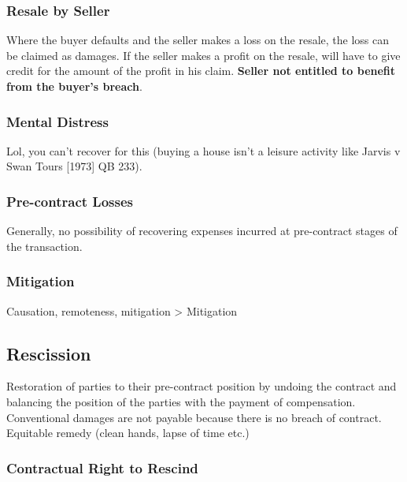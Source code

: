 \documentclass[
]{article}
\begin{document}
\hypertarget{resale-by-seller}{%
\subsubsection{Resale by Seller}\label{resale-by-seller}}

Where the buyer defaults and the seller makes a loss on the resale, the
loss can be claimed as damages. If the seller makes a profit on the
resale, will have to give credit for the amount of the profit in his
claim. \textbf{Seller not entitled to benefit from the buyer's breach}.

\hypertarget{mental-distress}{%
\subsubsection{Mental Distress}\label{mental-distress}}

Lol, you can't recover for this (buying a house isn't a leisure activity
like Jarvis v Swan Tours {[}1973{]} QB 233).

\hypertarget{pre-contract-losses}{%
\subsubsection{Pre-contract Losses}\label{pre-contract-losses}}

Generally, no possibility of recovering expenses incurred at
pre-contract stages of the transaction.

\hypertarget{mitigation}{%
\subsubsection{Mitigation}\label{mitigation}}

{Causation, remoteness, mitigation \textgreater{} Mitigation}

\hypertarget{rescission}{%
\subsection{Rescission}\label{rescission}}

Restoration of parties to their pre-contract position by undoing the
contract and balancing the position of the parties with the payment of
compensation. Conventional damages are not payable because there is no
breach of contract. Equitable remedy (clean hands, lapse of time etc.)

\hypertarget{contractual-right-to-rescind}{%
\subsubsection{Contractual Right to
Rescind}\label{contractual-right-to-rescind}}
\end{document}
